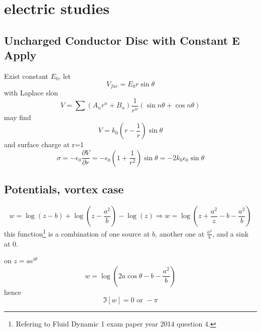 \section{electric studies}


\subsection{Uncharged Conductor Disc with Constant E Apply}
Exist constant $E_0$, let
\[
    V_{far}=E_0 r \sin{\theta}
\]
with Laplace slon \[V = \sum (A_n r^n+B_n) \frac{1}{r^n}(\sin{n\theta}+\cos{n\theta})\]
may find
\[
    V=k_0 (r-\frac{1}{r})\sin{\theta}
\]
and surface charge at r=1
\[
\sigma=-\epsilon_0\frac{\partial V}{\partial r}=-\epsilon_0 (1+\frac{1}{r^2})\sin{\theta}=-2k_0\epsilon_0\sin{\theta}
\]

\subsection{Potentials, vortex case}
\[w=\log (z -b) + \log (z-\frac{a^2}{b})-\log(z)\Longrightarrow w =\log (z +\frac{a^2}{z}-b-\frac{a^2}{b})\]
this function\footnote{Refering to Fluid Dynamic 1 exam paper year 2014 question 4.} is a combination of one source at $b$, another one at $\frac{a^2}{b}$, and a sink at $0$.

on $z=a e^{\mathrm{i}  \theta}$
\[ w=\log (2 a \cos{\theta}-b-\frac{a^2}{b})\]
hence
\[\Im[w]= 0 \text{ or } -\pi\]

%
%